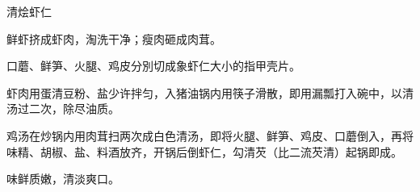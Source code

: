 \begin{recipe}{清烩虾仁}

\ingredients


\preparation

\step 鲜虾挤成虾肉，淘洗干净；瘦肉砸成肉茸。

\step 口蘑、鲜笋、火腿、鸡皮分別切成象虾仁大小的指甲壳片。

\step 虾肉用蛋清豆粉、盐少许拌匀，入猪油锅内用筷子滑散，即用漏瓢打入碗中，以清
汤过二次，除尽油质。

\step 鸡汤在炒锅内用肉茸扫两次成白色清汤，即将火腿、鲜笋、鸡皮、口蘑倒入，再将
味精、胡椒、盐、料酒放齐，开锅后倒虾仁，勾清芡（比二流芡清）起锅即成。

\features

味鲜质嫩，清淡爽口。

\end{recipe}

